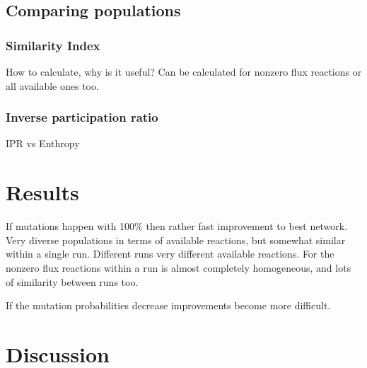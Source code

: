 \documentclass[]{article}
\begin{document}
\subsection{Comparing populations}
\label{sub:comparing_populations}


\subsubsection{Similarity Index}
\label{ssub:Similarity Index}

How to calculate, why is it useful? Can be calculated for nonzero flux reactions or all available ones too. 

\subsubsection{Inverse participation ratio}
\label{ssub:Inverse participation ratio}
IPR vs Enthropy

\section{Results}
\label{sec:results}

If mutations happen with 100$\%$ then rather fast improvement to best network. Very diverse populations in terms of available reactions, but somewhat similar within a single run. Different runs very different available reactions. For the nonzero flux reactions within a run is almost completely homogeneous, and lots of similarity between runs too. 

If the mutation probabilities decrease improvements become more difficult.


\section{Discussion}
\label{sec:discussion}
\end{document}
